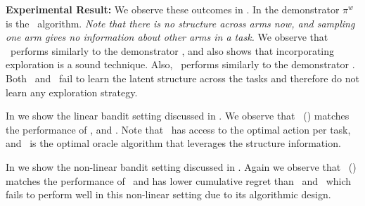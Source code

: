 \textbf{Experimental Result:} We observe these outcomes in . In  the demonstrator $\pi^w$ is the \ts\ algorithm. \textit{Note that there is no structure across arms now, and sampling one arm gives no information about other arms in a task.} We observe that \predt\ performs similarly to the demonstrator \ts, and also shows that incorporating exploration is a sound technique. Also, \ad\ performs similarly to the demonstrator \ts. Both \dptg\ and \pred\ fail to learn the latent structure across the tasks and therefore do not learn any exploration strategy. 


In  we show the linear bandit setting discussed in . We observe that \pred\ (\gt) matches the performance of \dpt, and \linucb. Note that \dpt\ has access to the optimal action per task, and \linucb\ is the optimal oracle algorithm that leverages the structure information. 

%
In  we show the non-linear bandit setting discussed in . 
%
Again we observe that \pred\ (\gt) matches the performance of \dpt\ and has lower cumulative regret than \ad\ and \linucb\ which fails to perform well in this non-linear setting due to its algorithmic design. 

